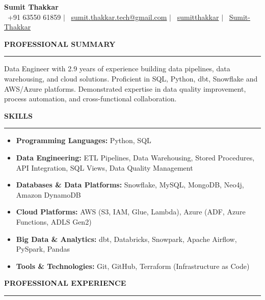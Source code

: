 \documentclass[11pt,a4paper]{article}
\begin{document}
\begin{center}
  {\Huge \textbf{Sumit Thakkar}}\\[8pt]
  {\small
  \faPhone\ +91 63550 61859 \enspace$|$\enspace
  \faEnvelope\ \href{mailto:sumit.thakkar.tech@gmail.com}{sumit.thakkar.tech@gmail.com} \enspace$|$\enspace
  \faLinkedin\ \href{https://www.linkedin.com/in/sumitthakkar}{sumitthakkar} \enspace$|$\enspace
  \faGithub\ \href{https://github.com/Sumit-Thakkar}{Sumit-Thakkar}
  }
\end{center}

\vspace{0.2cm}

\noindent\textbf{\large PROFESSIONAL SUMMARY}
\vspace{0.1cm}
\hrule
\vspace{0.15cm}
\noindent Data Engineer with 2.9 years of experience building data pipelines, data warehousing, and cloud solutions. Proficient in SQL, Python, dbt, Snowflake and AWS/Azure platforms. Demonstrated expertise in data quality improvement, process automation, and cross-functional collaboration.

\vspace{0.2cm}

\noindent\textbf{\large SKILLS}
\vspace{0.1cm}
\hrule
\vspace{0.15cm}
\begin{itemize}[leftmargin=*]
  \item \textbf{Programming Languages:} Python, SQL
  \item \textbf{Data Engineering:} ETL Pipelines, Data Warehousing, Stored Procedures, API Integration, SQL Views, Data Quality Management
  \item \textbf{Databases \& Data Platforms:} Snowflake, MySQL, MongoDB, Neo4j, Amazon DynamoDB
  \item \textbf{Cloud Platforms:} AWS (S3, IAM, Glue, Lambda), Azure (ADF, Azure Functions, ADLS Gen2)
  \item \textbf{Big Data \& Analytics:} dbt, Databricks, Snowpark, Apache Airflow, PySpark, Pandas
  \item \textbf{Tools \& Technologies:} Git, GitHub, Terraform (Infrastructure as Code)
\end{itemize}

\vspace{0.2cm}

\noindent\textbf{\large PROFESSIONAL EXPERIENCE}
\vspace{0.1cm}
\hrule
\vspace{0.2cm}
\end{document}
